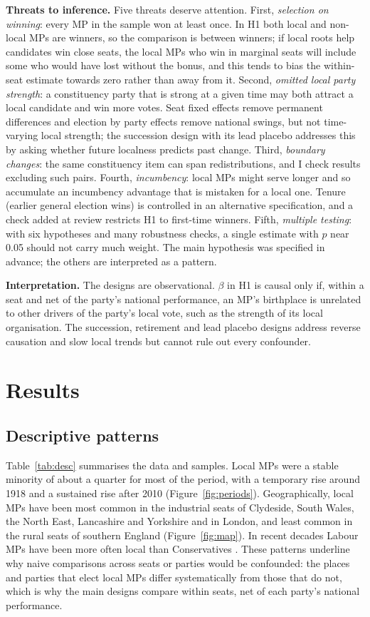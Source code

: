 \documentclass[11pt,a4paper]{article}
\begin{document}
\textbf{Threats to inference.} Five threats deserve attention. First, \emph{selection on winning}: every MP in the sample won at least once. In H1 both local and non-local MPs are winners, so the comparison is between winners; if local roots help candidates win close seats, the local MPs who win in marginal seats will include some who would have lost without the bonus, and this tends to bias the within-seat estimate towards zero rather than away from it. Second, \emph{omitted local party strength}: a constituency party that is strong at a given time may both attract a local candidate and win more votes. Seat fixed effects remove permanent differences and election by party effects remove national swings, but not time-varying local strength; the succession design with its lead placebo addresses this by asking whether future localness predicts past change. Third, \emph{boundary changes}: the same constituency item can span redistributions, and I check results excluding such pairs. Fourth, \emph{incumbency}: local MPs might serve longer and so accumulate an incumbency advantage that is mistaken for a local one. Tenure (earlier general election wins) is controlled in an alternative specification, and a check added at review restricts H1 to first-time winners. Fifth, \emph{multiple testing}: with six hypotheses and many robustness checks, a single estimate with $p$ near 0.05 should not carry much weight. The main hypothesis was specified in advance; the others are interpreted as a pattern.

\textbf{Interpretation.} The designs are observational. $\beta$ in H1 is causal only if, within a seat and net of the party's national performance, an MP's birthplace is unrelated to other drivers of the party's local vote, such as the strength of its local organisation. The succession, retirement and lead placebo designs address reverse causation and slow local trends but cannot rule out every confounder.

\section{Results}
\subsection{Descriptive patterns}
Table~\ref{tab:desc} summarises the data and samples. Local MPs were a stable minority of about a quarter for most of the period, with a temporary rise around 1918 and a sustained rise after 2010 (Figure~\ref{fig:periods}). Geographically, local MPs have been most common in the industrial seats of Clydeside, South Wales, the North East, Lancashire and Yorkshire and in London, and least common in the rural seats of southern England (Figure~\ref{fig:map}). In recent decades Labour MPs have been more often local than Conservatives \citep{hotham2026mpl}. These patterns underline why naive comparisons across seats or parties would be confounded: the places and parties that elect local MPs differ systematically from those that do not, which is why the main designs compare within seats, net of each party's national performance.
\end{document}
